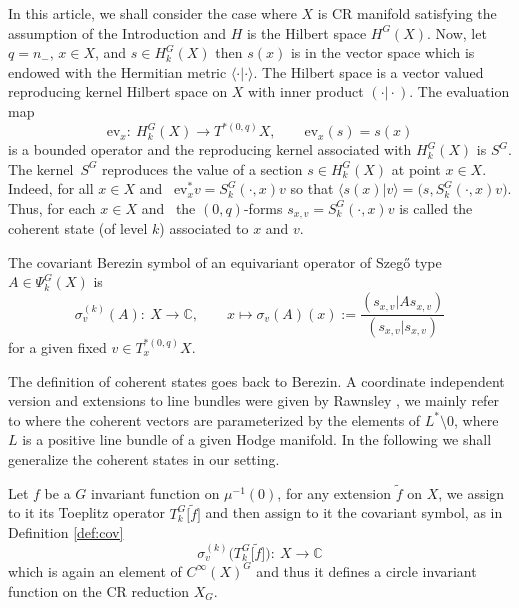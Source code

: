 \documentclass[10pt,a4paper]{amsart}
\numberwithin{equation}{section}
\begin{document}
	In this article, we shall consider the case where $X$ is CR manifold satisfying the assumption of the Introduction and $H$ is the Hilbert space $H^{G}(X)$. Now, let $q=n_-$, $x\in X$, and $s\in H^{G}_k(X)$ then $s(x)$ is in the vector space  which is endowed with the Hermitian metric $\langle \cdot \vert\cdot \rangle$. The Hilbert space  is a vector valued reproducing kernel Hilbert space on $X$ with inner product $( \cdot\vert\cdot )$. The evaluation map
	\[\mathrm{ev}_x \colon\ H^{G}_k(X) \rightarrow T^{* (0,q)}X,\qquad \mathrm{ev}_x(s)=s(x)\]
	is a bounded operator and the reproducing kernel associated with $H^{G}_k(X)$ is $S^{G}$. The kernel~$S^{G}$ reproduces the value of a section $s\in H^{G}_k(X)$ at point $x\in X$. Indeed, for all $x\in X$ and~
	$\mathrm{ev}_x^* v = S^{G}_k(\cdot, x) v $
	so that
	$\langle s(x)\vert v \rangle = \bigl(s, S^{G}_k(\cdot, x)v\bigr)$.
	Thus, for each $x\in X$ and~ the $(0,q)$-forms $s_{x,v}=S^{G}_k(\cdot, x) v$ is called the coherent state (of level $k$) associated to $x$ and $v$.
	
	\begin{Definition} \label{def:cov}
		The covariant Berezin symbol  of an equivariant operator of Szeg\H{o} type~${A\in \Psi^G_k(X)}$ is
		\[\sigma_v^{(k)}(A) \colon\ X \rightarrow \mathbb{C},\qquad x\mapsto \sigma_v(A)(x):=\frac{(s_{x,v}\vert As_{x,v})}{(s_{x,v}\vert s_{x,v})} \]
		for a given fixed $v\in T^{*(0,q)}_xX$.
	\end{Definition}
	
	
	\begin{Remark}
		The definition of coherent states goes back to Berezin. A coordinate independent version and extensions to line bundles were given by Rawnsley \cite{r}, we mainly refer to \cite{schl2} where the coherent vectors are parameterized by the elements of $L^*\setminus 0$, where $L$ is a positive line bundle of a given Hodge manifold. In the following we shall generalize the coherent states in our setting.
	\end{Remark}
	
	Let $f$ be a $G$ invariant function on $\mu^{-1}(0)$, for any extension $\widetilde{f}$ on $X$, we assign to it its Toeplitz operator $T^{G}_{k}\big[\widetilde{f}\big]$ and then assign to it the covariant symbol, as in Definition \ref{def:cov} \[\sigma_v^{(k)}\bigl(T^{G}_{k}\big[\widetilde{f}\big]\bigr) \colon\ X \rightarrow \mathbb{C}\] which is again an element of $C^{\infty}(X)^{G}$ and thus it defines a circle invariant function on the CR reduction $X_G$.
	
\end{document}
